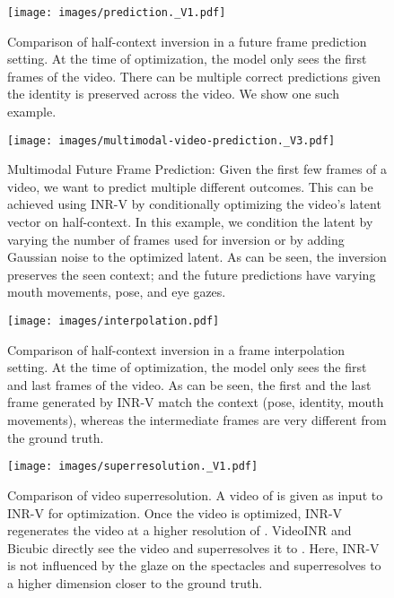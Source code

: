 \documentclass[10pt]{article} \usepackage[accepted]{tmlr}
\begin{document}
\begin{figure}[t]
  \centering
  \texttt{[image: images/prediction.\_V1.pdf]}
  \caption{Comparison of half-context inversion in a future frame prediction setting. At the time of optimization, the model only sees the first  frames of the video. There can be multiple correct predictions given the identity is preserved across the video. We show one such example.}
  \label{fig:frame-prediction-appendix}
\end{figure}

\begin{figure}[t]
  \centering
  \texttt{[image: images/multimodal-video-prediction.\_V3.pdf]}
  \caption{Multimodal Future Frame Prediction: Given the first few frames of a video, we want to predict multiple different outcomes. This can be achieved using INR-V by conditionally optimizing the video's latent vector on half-context. In this example, we condition the latent by varying the number of frames used for inversion or by adding Gaussian noise to the optimized latent.
  As can be seen, the inversion preserves the seen context; and the future predictions have varying mouth movements, pose, and eye gazes.}
  \label{fig:multimodalframe-prediction-appendix}
\end{figure}

\begin{figure}[t]
  \centering
  \texttt{[image: images/interpolation.pdf]}
  \caption{Comparison of half-context inversion in a frame interpolation setting. At the time of optimization, the model only sees the first and last frames of the video. As can be seen, the first and the last frame generated by INR-V match the context (pose, identity, mouth movements), whereas the intermediate frames are very different from the ground truth.}
  \label{fig:frame-interpolation-appendix}
\end{figure}

\begin{figure}[t]
  \centering
  \texttt{[image: images/superresolution.\_V1.pdf]}
  \caption{Comparison of video superresolution. A video of  is given as input to INR-V for optimization. Once the video is optimized, INR-V regenerates the video at a higher resolution of . VideoINR and Bicubic directly see the  video and superresolves it to . Here, INR-V is not influenced by the glaze on the spectacles and superresolves to a higher dimension closer to the ground truth.}
  \label{fig:inversion-superresolution-appendix}
\end{figure}
\end{document}
